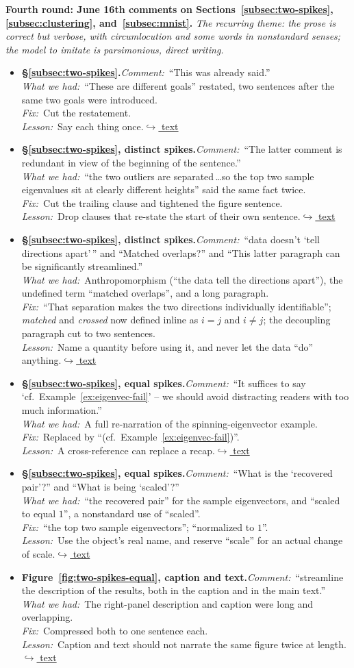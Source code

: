 \documentclass[12pt]{article}
\newcommand{\gdlogentry}[6]{%
  \item[\textcolor{thesisRev}{$\star$\,\ref{gdrev:#1}}]\hypertarget{gdlog:#1}{}%
  \textbf{#2.}\enspace\emph{Comment:}~#3\\
  \emph{What we had:}~#4\\
  \emph{Fix:}~#5\\
  \emph{Lesson:}~#6\enspace\hyperlink{gdtext:#1}{\textcolor{thesisLink}{$\hookrightarrow$ text}}}
\begin{document}
\medskip
\noindent\textbf{Fourth round: June 16th comments on Sections~\ref{subsec:two-spikes}, \ref{subsec:clustering}, and~\ref{subsec:mnist}.} \emph{The recurring theme: the prose is correct but verbose, with circumlocution and some words in nonstandard senses; the model to imitate is parsimonious, direct writing.}
\begin{itemize}[leftmargin=2.4em,itemsep=0.55em]
\gdlogentry{r4-goals}{\S\ref{subsec:two-spikes}}{``This was already said.''}{``These are different goals'' restated, two sentences after the same two goals were introduced.}{Cut the restatement.}{Say each thing once.}

\gdlogentry{r4-distinct-eigs}{\S\ref{subsec:two-spikes}, distinct spikes}{``The latter comment is redundant in view of the beginning of the sentence.''}{``the two outliers are separated\,\dots so the top two sample eigenvalues sit at clearly different heights'' said the same fact twice.}{Cut the trailing clause and tightened the figure sentence.}{Drop clauses that re-state the start of their own sentence.}

\gdlogentry{r4-distinct-overlaps}{\S\ref{subsec:two-spikes}, distinct spikes}{``data doesn't `tell directions apart'\,'' and ``Matched overlaps?'' and ``This latter paragraph can be significantly streamlined.''}{Anthropomorphism (``the data tell the directions apart''), the undefined term ``matched overlaps'', and a long paragraph.}{``That separation makes the two directions individually identifiable''; \emph{matched} and \emph{crossed} now defined inline as \(i=j\) and \(i\ne j\); the decoupling paragraph cut to two sentences.}{Name a quantity before using it, and never let the data ``do'' anything.}

\gdlogentry{r4-cf}{\S\ref{subsec:two-spikes}, equal spikes}{``It suffices to say `cf.\ Example~\ref{ex:eigenvec-fail}' -- we should avoid distracting readers with too much information.''}{A full re-narration of the spinning-eigenvector example.}{Replaced by ``(cf.\ Example~\ref{ex:eigenvec-fail})''.}{A cross-reference can replace a recap.}

\gdlogentry{r4-subspace-align}{\S\ref{subsec:two-spikes}, equal spikes}{``What is the `recovered pair'?'' and ``What is being `scaled'?''}{``the recovered pair'' for the sample eigenvectors, and ``scaled to equal \(1\)'', a nonstandard use of ``scaled''.}{``the top two sample eigenvectors''; ``normalized to \(1\)''.}{Use the object's real name, and reserve ``scale'' for an actual change of scale.}

\gdlogentry{r4-equal-table}{Figure~\ref{fig:two-spikes-equal}, caption and text}{``streamline the description of the results, both in the caption and in the main text.''}{The right-panel description and caption were long and overlapping.}{Compressed both to one sentence each.}{Caption and text should not narrate the same figure twice at length.}


\end{itemize}
\end{document}

